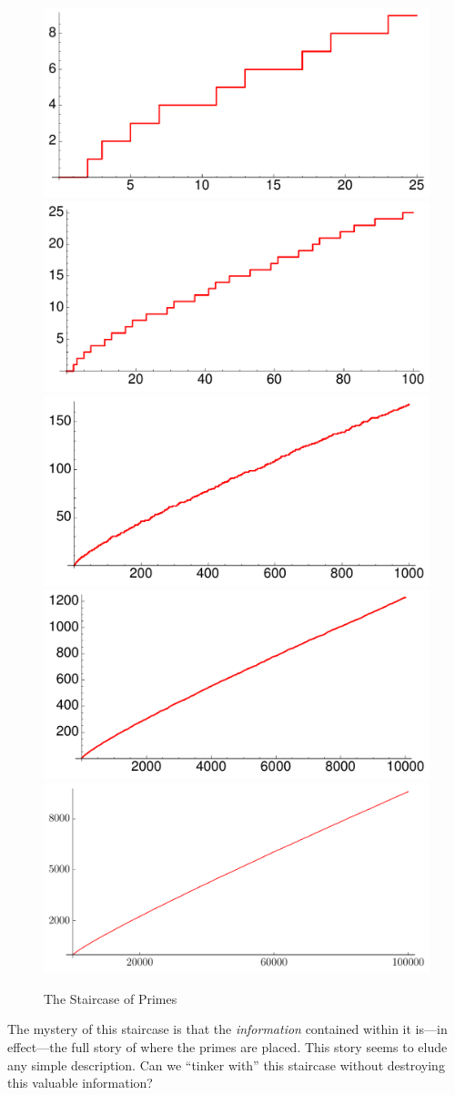 \documentclass[11pt,draft]{article}
\theoremstyle{plain}
\theoremstyle{definition}
\numberwithin{equation}{section}
\numberwithin{figure}{section}
\numberwithin{table}{section}
\begin{document}
\begin{figure}[H]
\begin{center}
\includegraphics[width=.4\textwidth]{illustrations/PN_25} 
\includegraphics[width=.4\textwidth]{illustrations/PN_100}\\ 

\includegraphics[width=.4\textwidth]{illustrations/PN_1000}
\includegraphics[width=.4\textwidth]{illustrations/PN_10000}\\ 

\includegraphics[width=.6\textwidth]{illustrations/PN_100000}
\end{center}
\caption{The Staircase of Primes\label{fig:staircases}}
\end{figure}

The mystery of this staircase is that the {\em information} contained
within it is---in effect---the full story of where the primes are
placed. This story seems to elude any simple description.  Can we
``tinker with'' this staircase without destroying this valuable
information?
 
\end{document}
